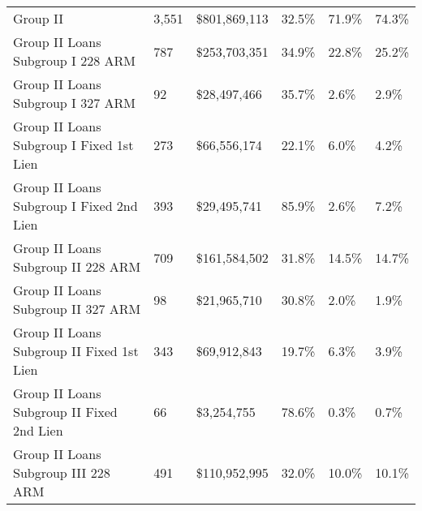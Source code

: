 \begin{tabular}{llllll}
Group II                                   &                        3,551 &                   \$801,869,113 &                              32.5\% &                         71.9\% &                                              74.3\% \\
Group II Loans Subgroup I 228 ARM          &                          787 &                   \$253,703,351 &                              34.9\% &                         22.8\% &                                              25.2\% \\
Group II Loans Subgroup I 327 ARM          &                           92 &                    \$28,497,466 &                              35.7\% &                          2.6\% &                                               2.9\% \\
Group II Loans Subgroup I Fixed 1st Lien   &                          273 &                    \$66,556,174 &                              22.1\% &                          6.0\% &                                               4.2\% \\
Group II Loans Subgroup I Fixed 2nd Lien   &                          393 &                    \$29,495,741 &                              85.9\% &                          2.6\% &                                               7.2\% \\
Group II Loans Subgroup II 228 ARM         &                          709 &                   \$161,584,502 &                              31.8\% &                         14.5\% &                                              14.7\% \\
Group II Loans Subgroup II 327 ARM         &                           98 &                    \$21,965,710 &                              30.8\% &                          2.0\% &                                               1.9\% \\
Group II Loans Subgroup II Fixed 1st Lien  &                          343 &                    \$69,912,843 &                              19.7\% &                          6.3\% &                                               3.9\% \\
Group II Loans Subgroup II Fixed 2nd Lien  &                           66 &                     \$3,254,755 &                              78.6\% &                          0.3\% &                                               0.7\% \\
Group II Loans Subgroup III 228 ARM        &                          491 &                   \$110,952,995 &                              32.0\% &                         10.0\% &                                              10.1\% \\

\end{tabular}
